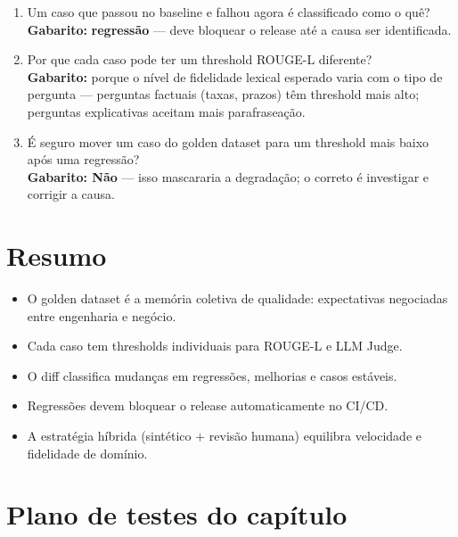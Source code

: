 \begin{enumerate}[leftmargin=*]
  \item Um caso que passou no baseline e falhou agora \'e
        classificado como o qu\^e?\\
        \textbf{Gabarito:} \textbf{regress\~ao} --- deve bloquear
        o release at\'e a causa ser identificada.

  \item Por que cada caso pode ter um threshold ROUGE-L
        diferente?\\
        \textbf{Gabarito:} porque o n\'ivel de fidelidade lexical
        esperado varia com o tipo de pergunta --- perguntas factuais
        (taxas, prazos) t\^em threshold mais alto; perguntas
        explicativas aceitam mais parafrasea\c{c}\~ao.

  \item \'E seguro mover um caso do golden dataset para um
        threshold mais baixo ap\'os uma regress\~ao?\\
        \textbf{Gabarito: N\~ao} --- isso mascararia a degrada\c{c}\~ao;
        o correto \'e investigar e corrigir a causa.
\end{enumerate}

\section{Resumo}

\begin{itemize}[leftmargin=*]
  \item O golden dataset \'e a mem\'oria coletiva de qualidade:
        expectativas negociadas entre engenharia e neg\'ocio.
  \item Cada caso tem thresholds individuais para ROUGE-L e
        LLM Judge.
  \item O diff classifica mudan\c{c}as em regress\~oes, melhorias
        e casos est\'aveis.
  \item Regress\~oes devem bloquear o release automaticamente no
        CI/CD.
  \item A estrat\'egia h\'ibrida (sint\'etico + revis\~ao humana)
        equilibra velocidade e fidelidade de dom\'inio.
\end{itemize}

\section{Plano de testes do cap\'itulo}

